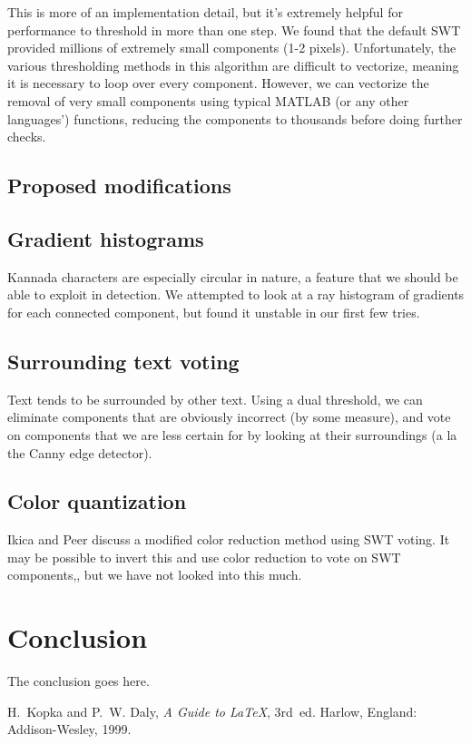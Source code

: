 \documentclass[11pt,twocolumn]{article}
\begin{document}
This is more of an implementation detail, but it's extremely helpful for performance to threshold in more than one step. We found that the default SWT provided millions of extremely small components (1-2 pixels). Unfortunately, the various thresholding methods in this algorithm are difficult to vectorize, meaning it is necessary to loop over every component. However, we can vectorize the removal of very small components using typical MATLAB (or any other languages') functions, reducing the components to thousands before doing further checks.

\subsection{Proposed modifications}

\subsection{Gradient histograms}

Kannada characters are especially circular in nature, a feature that we should be able to exploit in detection. We attempted to look at a ray histogram of gradients for each connected component, but found it unstable in our first few tries.

\subsection{Surrounding text voting}

Text tends to be surrounded by other text. Using a dual threshold, we can eliminate components that are obviously incorrect (by some measure), and vote on components that we are less certain for by looking at their surroundings (a la the Canny edge detector).

\subsection{Color quantization}

Ikica and Peer discuss a modified color reduction method using SWT voting. It may be possible to invert this and use color reduction to vote on SWT components,, but we have not looked into this much.


\section{Conclusion}



The conclusion goes here.

\begin{thebibliography}{1}

H.~Kopka and P.~W. Daly, \emph{A Guide to {\LaTeX}}, 3rd~ed. Harlow, England: Addison-Wesley, 1999.

\end{thebibliography}
\end{document}
